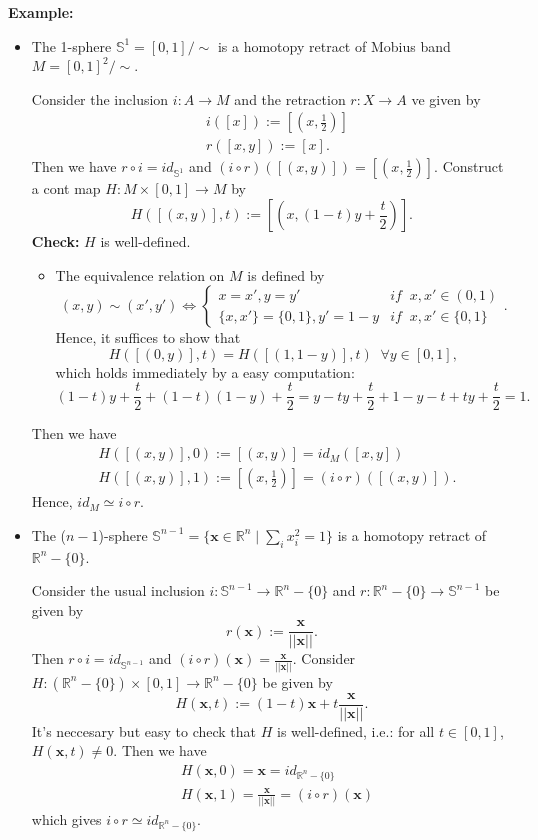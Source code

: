 \noindent\textbf{Example:}
\begin{itemize}
    \item The 1-sphere $\mathbb{S}^1 = [0,1]/\sim$ is a homotopy retract of Mobius band $M = [0,1]^2/\sim$.

    Consider the inclusion $i:A \rightarrow M$ and the retraction $r:X\rightarrow A$ ve given by
    \begin{align*}
        &i([x]):= [(x,\frac{1}{2})]\\
        &r([x,y]) := [x].
    \end{align*}
    Then we have $r \circ i = id_{\mathbb{S}^1}$ and $(i \circ r) ([(x,y)]) = [(x,\frac{1}{2})]$. Construct a cont map $H : M \times [0,1] \rightarrow M$ by
    $$H([(x,y)] , t) := [(x, (1-t)y + \frac{t}{2})].$$
    \textbf{Check:} $H$ is well-defined.
    \begin{itemize}
        \item The equivalence relation on $M$ is defined by
        $$(x,y) \sim (x',y') \Leftrightarrow \begin{cases}
            x=x',y=y'&if\;\;x,x'\in (0,1)\\
            \{x,x'\} = \{0,1 \}, y' = 1-y&if \;\; x,x' \in \{0,1\}
        \end{cases}.$$
        Hence, it suffices to show that
        $$H ([(0,y)],t) = H ([(1,1-y)],t) \;\;\forall y\in [0,1],$$
        which holds immediately by a easy computation:
        $$(1-t)y + \frac{t}{2} + (1-t)(1-y) + \frac{t}{2} = y-ty+ \frac{t}{2} + 1-y-t+ty + \frac{t}{2} = 1.$$
    \end{itemize}
    Then we have
    \begin{align*}
        &H([(x,y)],0) := [(x,y)] = id_M ([x,y])\\
        &H([(x,y)],1) := [(x,\frac{1}{2})] = (i \circ r) ([(x,y)]).
    \end{align*}
    Hence, $id_M \simeq i \circ r$. 
    \item The ($n-1$)-sphere $\mathbb{S}^{n-1} = \{ \mathbf{x} \in \mathbb{R}^n \mid \sum_{i} x_i^2 = 1 \}$ is a homotopy retract of $\mathbb{R}^n - \{0\}$.

    Consider the usual inclusion $i : \mathbb{S}^{n-1} \rightarrow \mathbb{R}^n - \{0\}$ and $r: \mathbb{R}^n - \{ 0\} \rightarrow \mathbb{S}^{n-1}$ be given by
    $$r (\mathbf{x}) := \frac{\mathbf{x}}{||\mathbf{x}||}.$$
    Then $r \circ i = id_{\mathbb{S}^{n-1}}$ and $(i \circ r) (\mathbf{x}) = \frac{\mathbf{x}}{||\mathbf{x}||}$. Consider $H : (\mathbb{R}^n - \{0\}) \times [0,1] \rightarrow \mathbb{R}^n - \{0\}$ be given by
    $$H (\mathbf{x},t) := (1-t) \mathbf{x} + t \frac{\mathbf{x}}{||\mathbf{x}||}.$$
    It's neccesary but easy to check that $H$ is well-defined, i.e.: for all $t \in [0,1]$, $H (\mathbf{x},t) \neq 0$. Then we have
    \begin{align*}
        &H(\mathbf{x},0) = \mathbf{x} = id_{\mathbb{R}^n-\{0\}} \\
        &H(\mathbf{x},1) = \frac{\mathbf{x}}{||\mathbf{x}||} = (i\circ r)(\mathbf{x})
    \end{align*}
    which gives $i \circ r \simeq id_{\mathbb{R}^n - \{0\}}$.
\end{itemize}



